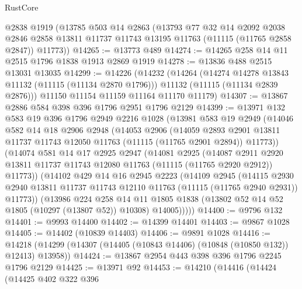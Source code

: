 \begin{lexlean}{RustCore}
\begin{coremodule}
    @2838
    @1919
    (@13785
      @503
      @14
      @2863
      (@13793
        @77
        @32
        @14
        @2092
        @2038
        @2846
        @2858
        @13811
        @11737
        @11743
        @13195
        @11763
        (@11115 (@11765 @2858 @2847))
        @11773))
@14265 := @13773 @489
@14274 := @14265 @258 @14 @11 @2515 @1796 @1838 @1913 @2869 @1919
@14278 := @13836 @488 @2515 @13031 @13035
@14299 := @14226
    (@14232
      (@14264
        (@14274 @14278 @13843 @11132 (@11115 (@11134 @2870 @1796)))
        @11132
        (@11115 (@11134 @2839 @2876)))
      @11150
      @11154
      @11159
      @11164
      @11170
      @11179)
@14307 := @13867 @2886 @584 @398 @396 @1796 @2951 @1796 @2129
@14399 := @13971
    @132
    @583
    @19
    @396
    @1796
    @2949
    @2216
    @1028
    (@13981
      @583
      @19
      @2949
      (@14046
        @582
        @14
        @18
        @2906
        @2948
        (@14053
          @2906
          (@14059
            @2893
            @2901
            @13811
            @11737
            @11743
            @12050
            @11763
            (@11115 (@11765 @2901 @2894))
            @11773))
        (@14074
          @581
          @14
          @17
          @2925
          @2947
          (@14081
            @2925
            (@14087
              @2911
              @2920
              @13811
              @11737
              @11743
              @12080
              @11763
              (@11115 (@11765 @2920 @2912))
              @11773))
          (@14102
            @429
            @14
            @16
            @2945
            @2223
            (@14109
              @2945
              (@14115
                @2930
                @2940
                @13811
                @11737
                @11743
                @12110
                @11763
                (@11115 (@11765 @2940 @2931))
                @11773))
            (@13986
              @224
              @258
              @14
              @11
              @1805
              @1838
              (@13802 @52 @14 @52 @1805 (@10297 (@13807 @52)) @10308)
              @14005)))))
@14400 := @9796 @132
@14401 := @9993 @14400
@14402 := @14399 @14401
@14403 := @9867 @1028
@14405 := @14402 (@10839 @14403)
@14406 := @9891 @1028
@14416 := @14218 (@14299 (@14307 (@14405 (@10843 @14406) (@10848 (@10850 @132)) @12413) @13958))
@14424 := @13867 @2954 @443 @398 @396 @1796 @2245 @1796 @2129
@14425 := @13971 @92
@14453 := @14210
    (@14416
      (@14424
        (@14425
          @402
          @322
          @396

\end{coremodule}
\end{lexlean}
